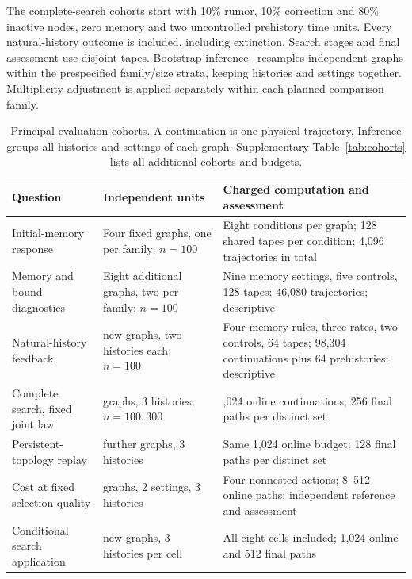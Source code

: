 \documentclass[preprint,11pt,sort&compress]{elsarticle}
\begin{document}
The complete-search cohorts start with 10\% rumor, 10\% correction and 80\% inactive nodes, zero memory and two uncontrolled prehistory time units. Every natural-history outcome is included, including extinction. Search stages and final assessment use disjoint tapes. Bootstrap inference~\cite{efron1979} resamples independent graphs within the prespecified family/size strata, keeping histories and settings together. Multiplicity adjustment is applied separately within each planned comparison family. 

\begin{table}[t]
\centering\small
\caption{Principal evaluation cohorts. A continuation is one physical trajectory. Inference groups all histories and settings of each graph. Supplementary Table~\ref{tab:cohorts} lists all additional cohorts and budgets.}
\label{tab:jcs_cohorts}
\begin{tabular}{>{\raggedright\arraybackslash}p{}>{\raggedright\arraybackslash}p{}>{\raggedright\arraybackslash}p{}}
\toprule
Question & Independent units & Charged computation and assessment\\
\midrule
Initial-memory response & Four fixed graphs, one per family; $n=100$ & Eight conditions per graph; 128 shared tapes per condition; 4,096 trajectories in total\\
Memory and bound diagnostics & Eight additional graphs, two per family; $n=100$ & Nine memory settings, five controls, 128 tapes; 46,080 trajectories; descriptive\\
Natural-history feedback & 32 new graphs, two histories each; $n=100$ & Four memory rules, three rates, two controls, 64 tapes; 98,304 continuations plus 64 prehistories; descriptive\\
Complete search, fixed joint law & 64 graphs, 3 histories; $n=100,300$ & 1,024 online continuations; 256 final paths per distinct set\\
Persistent-topology replay & 32 further graphs, 3 histories & Same 1,024 online budget; 128 final paths per distinct set\\
Cost at fixed selection quality & 32 graphs, 2 settings, 3 histories & Four nonnested actions; 8--512 online paths; independent reference and assessment\\
Conditional search application & 60 new graphs, 3 histories per cell & All eight cells included; 1,024 online and 512 final paths\\
\bottomrule
\end{tabular}
\end{table}
\end{document}
